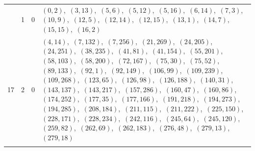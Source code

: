 \documentclass[11pt]{article}
\begin{document}
\begin{longtable}{@{}rrl>{\raggedright\arraybackslash}p{}@{}}
\addlinespace[3pt]
17 & 1 & $0$ & $(0,2)$,\allowbreak\ $(3,13)$,\allowbreak\ $(5,6)$,\allowbreak\ $(5,12)$,\allowbreak\ $(5,16)$,\allowbreak\ $(6,14)$,\allowbreak\ $(7,3)$,\allowbreak\ $(10,9)$,\allowbreak\ $(12,5)$,\allowbreak\ $(12,14)$,\allowbreak\ $(12,15)$,\allowbreak\ $(13,1)$,\allowbreak\ $(14,7)$,\allowbreak\ $(15,15)$,\allowbreak\ $(16,2)$\\
17 & 2 & $0$ & $(4,14)$,\allowbreak\ $(7,132)$,\allowbreak\ $(7,256)$,\allowbreak\ $(21,269)$,\allowbreak\ $(24,205)$,\allowbreak\ $(24,251)$,\allowbreak\ $(38,235)$,\allowbreak\ $(41,81)$,\allowbreak\ $(41,154)$,\allowbreak\ $(55,201)$,\allowbreak\ $(58,103)$,\allowbreak\ $(58,200)$,\allowbreak\ $(72,167)$,\allowbreak\ $(75,30)$,\allowbreak\ $(75,52)$,\allowbreak\ $(89,133)$,\allowbreak\ $(92,1)$,\allowbreak\ $(92,149)$,\allowbreak\ $(106,99)$,\allowbreak\ $(109,239)$,\allowbreak\ $(109,268)$,\allowbreak\ $(123,65)$,\allowbreak\ $(126,98)$,\allowbreak\ $(126,188)$,\allowbreak\ $(140,31)$,\allowbreak\ $(143,137)$,\allowbreak\ $(143,217)$,\allowbreak\ $(157,286)$,\allowbreak\ $(160,47)$,\allowbreak\ $(160,86)$,\allowbreak\ $(174,252)$,\allowbreak\ $(177,35)$,\allowbreak\ $(177,166)$,\allowbreak\ $(191,218)$,\allowbreak\ $(194,273)$,\allowbreak\ $(194,285)$,\allowbreak\ $(208,184)$,\allowbreak\ $(211,115)$,\allowbreak\ $(211,222)$,\allowbreak\ $(225,150)$,\allowbreak\ $(228,171)$,\allowbreak\ $(228,234)$,\allowbreak\ $(242,116)$,\allowbreak\ $(245,64)$,\allowbreak\ $(245,120)$,\allowbreak\ $(259,82)$,\allowbreak\ $(262,69)$,\allowbreak\ $(262,183)$,\allowbreak\ $(276,48)$,\allowbreak\ $(279,13)$,\allowbreak\ $(279,18)$\\
\addlinespace[3pt]
\end{longtable}
\endgroup
\end{document}
